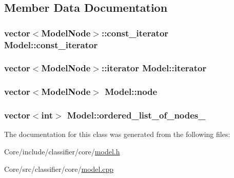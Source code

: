 \subsection{Member Data Documentation}
\hypertarget{classModel_a578f203623cdda48b577f10a8d6e12d4}{
\subsubsection[{const\+\_\+iterator}]{\setlength{\rightskip}{0pt plus 5cm}vector$<$Model\+Node$>$\+::const\+\_\+iterator Model\+::const\+\_\+iterator}}\label{classModel_a578f203623cdda48b577f10a8d6e12d4}
\hypertarget{classModel_a0cfbe847990e80cb9033e8a3257bced2}{
\subsubsection[{iterator}]{\setlength{\rightskip}{0pt plus 5cm}vector$<$Model\+Node$>$\+::iterator Model\+::iterator}}\label{classModel_a0cfbe847990e80cb9033e8a3257bced2}
\hypertarget{classModel_abf34f73f474d2eb05d2aa285cb88b828}{
\subsubsection[{node}]{\setlength{\rightskip}{0pt plus 5cm}vector$<$Model\+Node$>$ Model\+::node\hspace{0.3cm}{\ttfamily [private]}}}\label{classModel_abf34f73f474d2eb05d2aa285cb88b828}
\hypertarget{classModel_a3324528ad5418b5d1a1a9a4b2a24e6e8}{
\subsubsection[{ordered\+\_\+list\+\_\+of\+\_\+nodes\+\_\+}]{\setlength{\rightskip}{0pt plus 5cm}vector$<$int$>$ Model\+::ordered\+\_\+list\+\_\+of\+\_\+nodes\+\_\+\hspace{0.3cm}{\ttfamily [private]}}}\label{classModel_a3324528ad5418b5d1a1a9a4b2a24e6e8}


The documentation for this class was generated from the following files\+:\begin{DoxyCompactItemize}
\item 
Core/include/classifier/core/\hyperlink{model_8h}{model.\+h}\item 
Core/src/classifier/core/\hyperlink{model_8cpp}{model.\+cpp}\end{DoxyCompactItemize}
